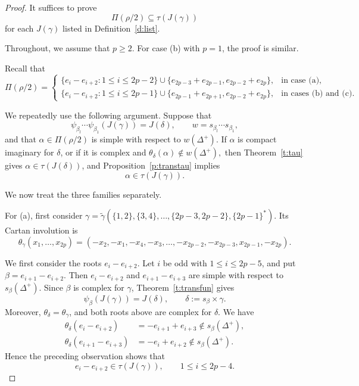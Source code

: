 \documentclass{amsart}
\theoremstyle{definition}
\newcommand{\tu}{\widetilde}
\begin{document}
\begin{proof}


It suffices to prove
\[
\Pi(\rho/2)\subseteq\tau(J(\gamma))
\]
for each \(J(\gamma)\) listed in Definition~\ref{d:list}. 

Throughout, we assume that $p\ge 2$. For case (b) with $p=1$, the proof is similar. 

Recall that
\[
\Pi(\rho/2)=
\begin{cases}
\{e_i-e_{i+2}:1\leq i\leq2p-2\}
\cup
\{e_{2p-3}+e_{2p-1},
  e_{2p-2}+e_{2p}\},
&\text{in case (a)},\\[1mm]
\{e_i-e_{i+2}:1\leq i\leq2p-1\}
\cup
\{e_{2p-1}+e_{2p+1},
  e_{2p-2}+e_{2p}\},
&\text{in cases (b) and (c)}.
\end{cases}
\]

We repeatedly use the following argument. Suppose that
\[
\psi_{\beta_l}\cdots\psi_{\beta_1}(J(\gamma))
=
J(\delta),
\qquad
w=s_{\beta_l}\cdots s_{\beta_1},
\]
and that \(\alpha\in\Pi(\rho/2)\) is simple with respect to
\(w(\Delta^+)\). If \(\alpha\) is compact imaginary for \(\delta\),
or if it is complex and
$\theta_\delta(\alpha)\notin w(\Delta^+),$ then Theorem~\ref{t:tau} gives
\(\alpha\in\tau(J(\delta))\), and
Proposition~\ref{p:transtau} implies
\[
\alpha\in\tau(J(\gamma)).
\]

We now treat the three families separately.
\medskip


For (a), first consider
$\gamma=
\tu\gamma(\{1,2\},\{3,4\},\ldots,
\{2p-3,2p-2\},\{2p-1\}^*).$
Its Cartan involution is
\[
\theta_\gamma(x_1,\ldots,x_{2p})
=
(-x_2,-x_1,-x_4,-x_3,\ldots,
-x_{2p-2},-x_{2p-3},x_{2p-1},-x_{2p}).
\]

We first consider the roots \(e_i-e_{i+2}\).
Let \(i\) be odd with \(1\leq i\leq 2p-5\), and put
$\beta=e_{i+1}-e_{i+2}.$
Then
$e_i-e_{i+2}$ and 
$e_{i+1}-e_{i+3}$
are simple with respect to \(s_\beta(\Delta^+)\).
Since \(\beta\) is complex for \(\gamma\), Theorem~\ref{t:transfun}
gives
\[
\psi_\beta(J(\gamma))
=
J(\delta),
\qquad
\delta:=s_\beta\times\gamma.
\]
Moreover, \(\theta_\delta=\theta_\gamma\), and both roots above are
complex for \(\delta\). We have
\begin{align*}
\theta_\delta(e_i-e_{i+2})
&=-e_{i+1}+e_{i+3}
   \notin s_\beta(\Delta^+),\\
\theta_\delta(e_{i+1}-e_{i+3})
&=-e_i+e_{i+2}
   \notin s_\beta(\Delta^+).
\end{align*}
Hence the preceding observation shows that
\[
e_i-e_{i+2}\in\tau(J(\gamma)),
\qquad
1\leq i\leq 2p-4.
\]


\end{proof}
\end{document}
